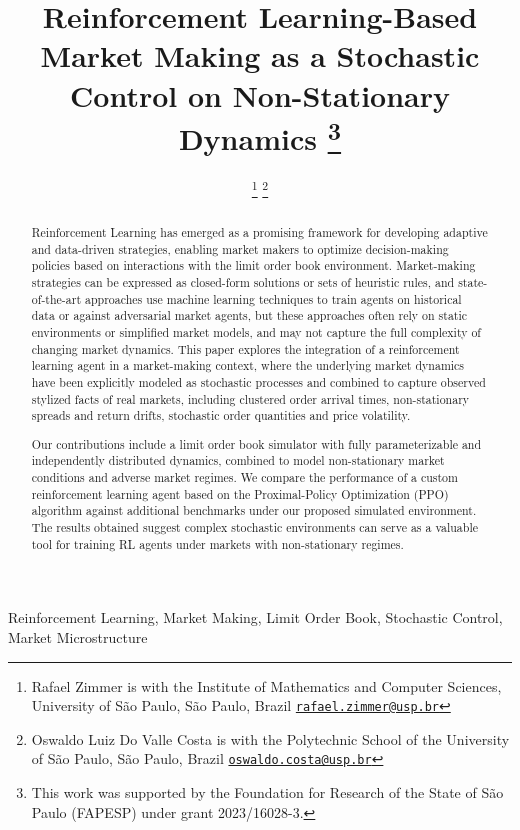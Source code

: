 \IEEEoverridecommandlockouts
\title{
    \LARGE
    \bfseries
    Reinforcement Learning-Based Market Making as a Stochastic Control on Non-Stationary Dynamics
    \thanks{This work was supported by the Foundation for Research of the State of São Paulo (FAPESP) under grant 2023/16028-3.}
}

\author{
    \thanks{Rafael Zimmer is with the Institute of Mathematics and Computer Sciences, University of São Paulo, São Paulo, Brazil \href{mailto:rafael.zimmer@usp.br}{\tt\small rafael.zimmer@usp.br}}
    \thanks{Oswaldo Luiz Do Valle Costa is with the Polytechnic School of the University of São Paulo, São Paulo, Brazil \href{mailto:mailto:oswaldo.costa@usp.br}{\tt\small oswaldo.costa@usp.br}}
}

\maketitle

\begin{abstract}
    Reinforcement Learning has emerged as a promising framework for developing adaptive and data-driven strategies,
    enabling market makers to optimize decision-making policies based on interactions with the limit order book environment.
    Market-making strategies can be expressed as closed-form solutions or sets of heuristic rules,
    and state-of-the-art approaches use machine learning techniques to train agents on historical data or against adversarial market agents,
    but these approaches often rely on static environments or simplified market models, and may not capture the full complexity of changing market dynamics.
    This paper explores the integration of a reinforcement learning agent in a market-making context,
    where the underlying market dynamics have been explicitly modeled as stochastic processes and combined to capture observed stylized facts of real markets,
    including clustered order arrival times, non-stationary spreads and return drifts, stochastic order quantities and price volatility.

    Our contributions include a limit order book simulator with fully parameterizable and independently distributed dynamics,
    combined to model non-stationary market conditions and adverse market regimes.
    We compare the performance of a custom reinforcement learning agent based on the Proximal-Policy Optimization (PPO) algorithm
    against additional benchmarks under our proposed simulated environment.
    The results obtained suggest complex stochastic environments can serve as a valuable tool for training RL agents under markets with non-stationary regimes.
\end{abstract}

\begin{IEEEkeywords}
    Reinforcement Learning, Market Making, Limit Order Book, Stochastic Control, Market Microstructure
\end{IEEEkeywords}
